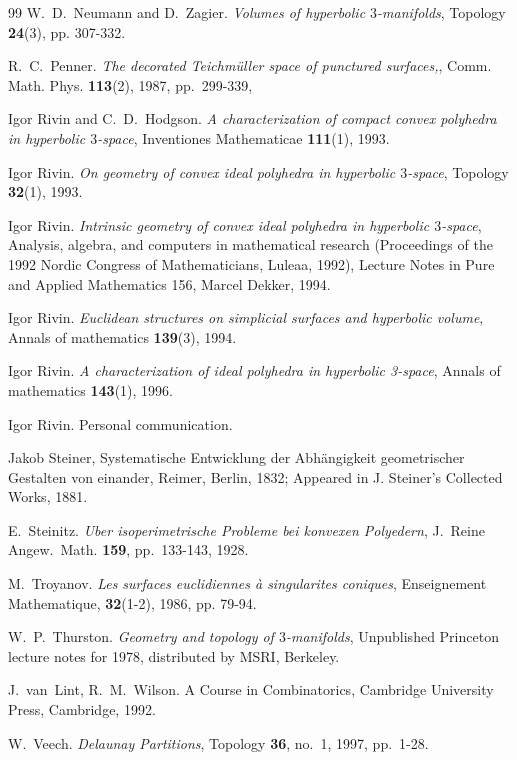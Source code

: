 \documentclass{acmart}
\begin{document}
\begin{thebibliography}{99}
W.~D.~Neumann and D.~Zagier.
\textit{Volumes of hyperbolic $3$-manifolds}, Topology \textbf{24}(3),
pp. 307-332.

R.~C.~Penner.
\textit{The decorated Teichm\"uller space of punctured surfaces,\/},
Comm. Math. Phys. {\bf 113}(2), 1987, pp.~299-339,

Igor Rivin and C.~D.~Hodgson.
\textit{A characterization of compact convex polyhedra in hyperbolic
  $3$-space\/}, Inventiones Mathematicae \textbf{111}(1), 1993.

Igor Rivin.
\textit{On geometry of convex ideal polyhedra in hyperbolic $3$-space\/},
Topology \textbf{32}(1), 1993.

Igor Rivin.
\textit{Intrinsic geometry of convex ideal polyhedra in hyperbolic
  $3$-space\/}, 
Analysis, algebra, and computers in mathematical research (Proceedings
of the 1992 Nordic Congress of Mathematicians, Luleaa, 1992), Lecture
Notes in Pure and Applied Mathematics 156, Marcel Dekker, 1994.

Igor Rivin. 
\textit{Euclidean structures on simplicial surfaces and hyperbolic
volume\/}, Annals of mathematics \textbf{139}(3), 1994.

Igor Rivin.
\textit{A characterization of ideal polyhedra in hyperbolic 3-space\/},
Annals of mathematics \textbf{143}(1), 1996.

Igor Rivin. Personal communication.

Jakob Steiner,
Systematische Entwicklung der Abh\"angigkeit
geometrischer   Gestalten von einander,
Reimer, Berlin, 1832; Appeared in J. Steiner's Collected Works, 1881.

E.~Steinitz.
\textit{Uber isoperimetrische Probleme bei konvexen Polyedern\/},
J.~Reine Angew.~Math. \textbf{159}, pp.~133-143, 1928.

M.~Troyanov.
\textit{Les surfaces euclidiennes \`a singularites coniques},
Enseignement Mathematique, \textbf{32}(1-2), 1986, pp. 79-94.

W.~P.~Thurston.
\textit{Geometry and topology of $3$-manifolds\/}, Unpublished
Princeton lecture notes for 1978, distributed by MSRI, Berkeley.

J.~van~Lint, R.~M.~Wilson.
A Course in Combinatorics, Cambridge University Press, Cambridge,
1992.

W.~Veech.
\textit{Delaunay Partitions\/},
Topology {\bf 36}, no.~1, 1997, pp.~1-28.

\end{thebibliography}
\end{document}
